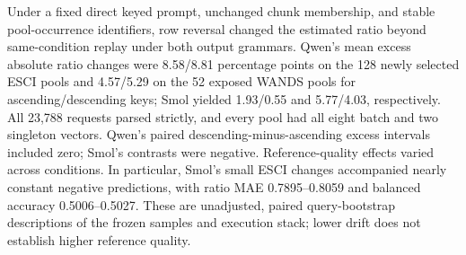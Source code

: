 Under a fixed direct keyed prompt, unchanged chunk membership, and stable pool-occurrence identifiers, row reversal changed the estimated ratio beyond same-condition replay under both output grammars. Qwen's mean excess absolute ratio changes were 8.58/8.81 percentage points on the 128 newly selected ESCI pools and 4.57/5.29 on the 52 exposed WANDS pools for ascending/descending keys; Smol yielded 1.93/0.55 and 5.77/4.03, respectively. All 23,788 requests parsed strictly, and every pool had all eight batch and two singleton vectors. Qwen's paired descending-minus-ascending excess intervals included zero; Smol's contrasts were negative. Reference-quality effects varied across conditions. In particular, Smol's small ESCI changes accompanied nearly constant negative predictions, with ratio MAE 0.7895--0.8059 and balanced accuracy 0.5006--0.5027. These are unadjusted, paired query-bootstrap descriptions of the frozen samples and execution stack; lower drift does not establish higher reference quality.


